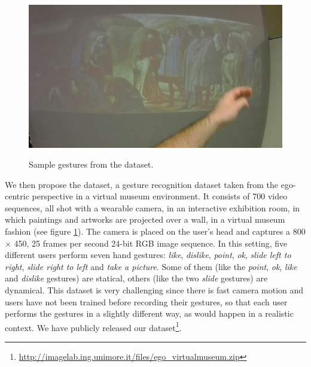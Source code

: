 \begin{figure}
{\includegraphics[width=0.2\linewidth]{Figures/slide_2_2030_2058_all23.jpg}
}\\
\caption{Sample gestures from the \datasetunimore{} dataset.}
\label{example-unimore}
\end{figure}

We then propose the \datasetunimore{} dataset, a gesture recognition dataset taken from the ego-centric perspective in a virtual museum environment. It consists of 700 video sequences, all shot with a wearable camera, in an interactive exhibition room, in which paintings and artworks are projected over a wall, in a virtual museum fashion (see figure \ref{example-unimore}). The camera is placed on the user's head and captures a 800 $\times$ 450, 25 frames per second 24-bit RGB image sequence. In this setting, five different users perform seven hand gestures: \textit{like}, \textit{dislike}, \textit{point}, \textit{ok}, \textit{slide left to right}, \textit{slide right to left} and \textit{take a picture}. Some of them (like the \textit{point}, \textit{ok}, \textit{like} and \textit{dislike} gestures) are statical, others (like the two \textit{slide} gestures) are dynamical. 
This dataset is very challenging since there is fast camera motion and users have not been trained before recording their gestures, so that each user performs the gestures in a slightly different way, as would happen in a realistic context. We have publicly released our dataset\footnote{\url{http://imagelab.ing.unimore.it/files/ego_virtualmuseum.zip}}.

